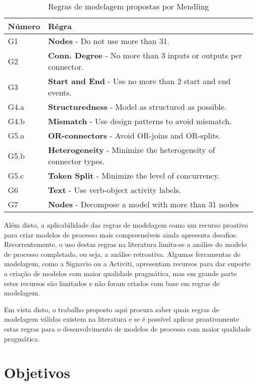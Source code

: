 \documentclass[12pt]{article}
\begin{document}
	\begin{table}
		\begin{tabularx}{\textwidth}{l X}\label{7PMG}
			Número & Régra\\\hline
			G1 & \textbf{Nodes} - Do not use more than 31.\\
			G2 & \textbf{Conn. Degree} - No more than 3 inputs or outputs per connector.\\
			G3 & \textbf{Start and End} - Use no more than 2 start and end events.\\
			G4.a & \textbf{Structuredness} - Model as structured as possible.\\
			G4.b & \textbf{Mismatch} - Use design patterns to avoid mismatch.\\
			G5.a & \textbf{OR-connectors} - Avoid OR-joins and OR-splits.\\
			G5.b & \textbf{Heterogeneity} - Minimize the heterogeneity of connector types.\\
			G5.c & \textbf{Token Split} - Minimize the level of concurrency.\\
			G6 & \textbf{Text} - Use verb-object activity labels.\\
			G7 & \textbf{Nodes} - Decompose a model with more than 31 nodes\\
		\end{tabularx}
		\caption{Regras de modelagem propostas por Mendling\cite{Mendling2013}}
	\end{table}


Além disto, a aplicabilidade das regras de modelagem como um recurso proativo para criar modelos de processo mais compreensíveis ainda apresenta desafios. Recorrentemente, o uso destas regras na literatura limita-se a análise do modelo de processo completado, ou seja, a análise retroativa. Algumas ferramentas de modelagem, como a Signavio ou a Activiti, apresentam recursos para dar suporte a criação de modelos com maior qualidade pragmática, mas em grande parte estes recursos são limitados e não foram criados com base em regras de modelagem.

Em vista disto, o trabalho proposto aqui procura saber quais regras de modelagem válidas existem na literatura e se é possível aplicar proativamente estas regras para o desenvolvimento de modelos de processo com maior qualidade pragmática.

\newpage
\section{Objetivos}
\end{document}
